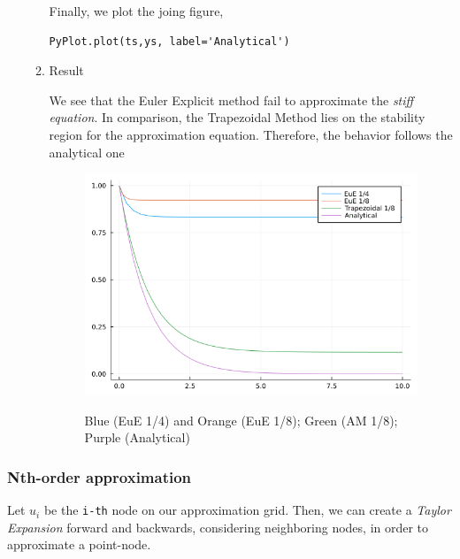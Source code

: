 \documentclass[11pt]{article}
\begin{document}
\begin{enumerate}
\begin{enumerate}
Finally, we plot the joing figure,
\begin{verbatim}
PyPlot.plot(ts,ys, label='Analytical')
\end{verbatim}

\item Result
\label{sec:orgfafb198}

We see that the Euler Explicit method fail to approximate the \emph{stiff equation}.
In comparison, the Trapezoidal Method lies on the stability region for the
approximation equation. Therefore, the behavior follows the analytical one

\begin{figure}[!htb]
  \centering
  \caption{\label{fig:sim1} Blue (EuE 1/4) and Orange (EuE 1/8); Green (AM 1/8); Purple (Analytical)}
  \includegraphics[width=0.45\linewidth]{Resources/img/exponential.png}
  \\ %
\end{figure}
\end{enumerate}
\end{enumerate}

\subsubsection{Nth-order approximation}
\label{sec:org8c5ba0a}
Let \(u_i\) be the \texttt{i-th} node on our approximation grid. Then, we can create a
\emph{Taylor Expansion} forward and backwards, considering neighboring nodes, in order
to approximate a point-node.
\end{document}
